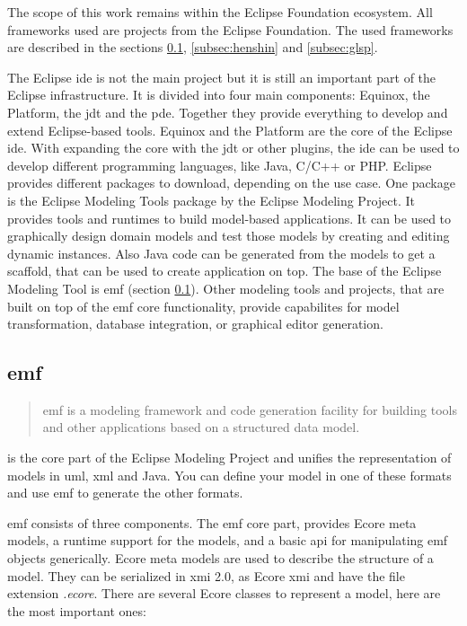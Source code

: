 \documentclass[conference,onecolumn]{IEEEtran}
\begin{document}
  The scope of this work remains within the Eclipse Foundation ecosystem. All frameworks used are projects from the Eclipse Foundation. The used frameworks are described in the sections \ref{subsec:emf}, \ref{subsec:henshin} and \ref{subsec:glsp}.

  The Eclipse \ac{ide} is not the main project but it is still an important part of the Eclipse infrastructure. It is divided into four main components: Equinox, the Platform, the \ac{jdt} and the \ac{pde}. Together they provide everything to develop and extend Eclipse-based tools. Equinox and the Platform are the core of the Eclipse \ac{ide}. With expanding the core with the \ac{jdt} or other plugins, the \ac{ide} can be used to develop different programming languages, like Java, C/C++ or PHP. \cite{emf} Eclipse provides different packages to download, depending on the use case. One package is the Eclipse Modeling Tools package by the Eclipse Modeling Project. It provides tools and runtimes to build model-based applications. It can be used to graphically design domain models and test those models by creating and editing dynamic instances. Also Java code can be generated from the models to get a scaffold, that can be used to create application on top. \cite{eclipse_modeling} The base of the Eclipse Modeling Tool is \ac{emf} (section \ref{subsec:emf}). Other modeling tools and projects, that are built on top of the \ac{emf} core functionality, provide capabilites for model transformation, database integration, or graphical editor generation. \cite{emf}

  \subsection{\acf{emf}}
    \label{subsec:emf}

    \begin{quote}
      \glqq\acf{emf} is a modeling framework and code generation facility for building tools and other applications based on a structured data model.\grqq{} \autocite{emf-repo}
    \end{quote}

     is the core part of the Eclipse Modeling Project and unifies the representation of models in \acs{uml}, \acs{xml} and Java. You can define your model in one of these formats and use \ac{emf} to generate the other formats.
    
    \ac{emf} consists of three components. The \ac{emf} core part, provides Ecore meta models, a runtime support for the models, and a basic \acs{api} for manipulating \ac{emf} objects generically. Ecore meta models are used to describe the structure of a model. \cite{eclipse_emf} They can be serialized in \ac{xmi} 2.0, as Ecore \ac{xmi} and have the file extension \textit{.ecore}. There are several Ecore classes to represent a model, here are the most important ones:
\end{document}
